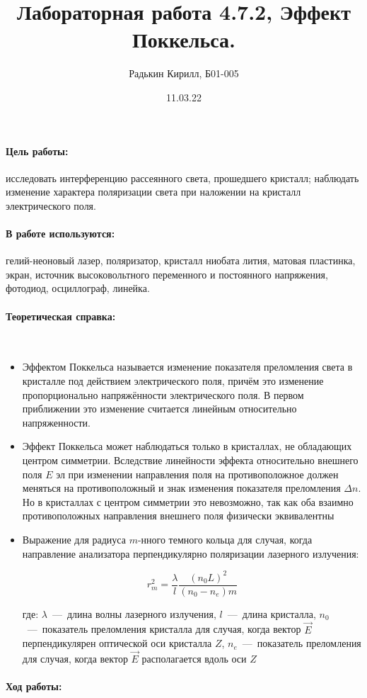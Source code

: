 \documentclass[a4paper, 12pt]{article}
\author{Радькин Кирилл, Б01-005}
\date{11.03.22}
\title{Лабораторная работа 4.7.2, Эффект Поккельса.}
\newcommand{\parag}[1]{\paragraph*{#1:}}
\begin{document}
\maketitle

\parag {Цель работы} исследовать интерференцию рассеянного света, прошедшего кристалл; наблюдать изменение характера поляризации света при наложении на кристалл электрического поля.

\parag {В работе используются} гелий-неоновый лазер, поляризатор, кристалл ниобата лития, матовая пластинка, экран, источник высоковольтного переменного и постоянного напряжения, фотодиод, осциллограф, линейка.

\parag{Теоретическая справка} ~

\begin{itemize}
    \item Эффектом Поккельса называется изменение показателя преломления света в кристалле под действием электрического поля, причём это изменение пропорционально напряжённости электрического поля. В первом приближении это изменение считается линейным относительно напряженности.
    
    \item Эффект Поккельса может наблюдаться только в кристаллах, не обладающих центром симметрии. Вследствие линейности эффекта относительно внешнего поля $E$ эл при изменении направления поля на противоположное должен меняться на противоположный
    и знак изменения показателя преломления $\Delta n$. Но в кристаллах с центром симметрии это невозможно, так как оба взаимно противоположных направления внешнего поля физически эквивалентны
    
    \item Выражение для радиуса $m$-нного темного кольца для случая, когда направление анализатора перпендикулярно поляризации лазерного излучения:

    \begin{equation}
        r^2_m = \dfrac{\lambda}{l} \dfrac{(n_0 L)^2}{(n_0 - n_e)m}
    \end{equation}
    
    где: $\lambda$~---~длина волны лазерного излучения, $l$~---~длина кристалла, $n_0$~---~показатель преломления кристалла для случая, когда вектор $\vec{E}$ перпендикулярен оптической оси кристалла $Z$, $n_e$~---~показатель преломления для случая, когда вектор $\vec{E}$ располагается вдоль оси $Z$
\end{itemize}

\parag {Ход работы} ~
\end{document}
